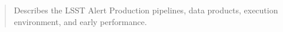 
\begin{abstract}
Describes the LSST Alert Production pipelines, data products, execution environment, and early performance.
\end{abstract}

